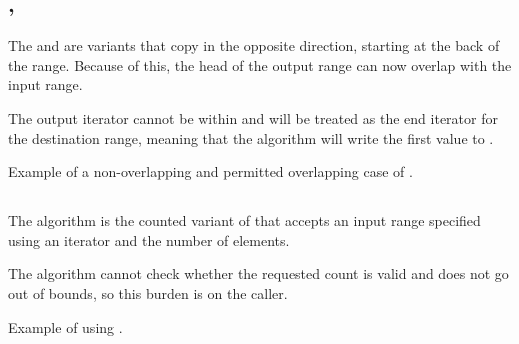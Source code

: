 \subsection{\texorpdfstring{, }{\texttt{std::copy\_backward}, \texttt{std::move\_backward}}}

The  and  are variants that copy in the opposite direction, starting at the back of the range. Because of this, the head of the output range can now overlap with the input range.



The output iterator cannot be within \cpp{(first, last]} and will be treated as the end iterator for the destination range, meaning that the algorithm will write the first value to .

\begin{box-note}
\footnotesize Example of a non-overlapping and permitted overlapping case of .
\tcblower
{}
\end{box-note}

\subsection{\texorpdfstring{}{\texttt{std::copy\_n}}}

The  algorithm is the counted variant of  that accepts an input range specified using an iterator and the number of elements.


The algorithm cannot check whether the requested count is valid and does not go out of bounds, so this burden is on the caller.

\begin{box-note}
\footnotesize Example of using .
\tcblower
{}
\end{box-note}






